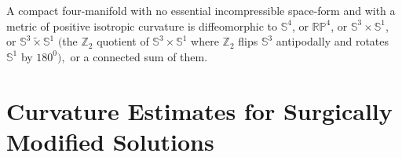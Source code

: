 \begin{theorem}
  \label{thm:cz-positive-isotropic-curvature-four-manifold-classification}

A compact four-manifold with no essential incompressible
space-form and with a metric of positive isotropic curvature is
diffeomorphic to $\mathbb{S}^4$, or $\mathbb{RP}^4$, or
$\mathbb{S}^3\times \mathbb{S}^1$, or
$\mathbb{S}^3\widetilde{\times}\mathbb{S}^1$ $($the $\mathbb{Z}_2$
quotient of $\mathbb{S}^{3}\times \mathbb{S}^{1}$ where
$\mathbb{Z}_{2}$ flips $\mathbb{S}^{3}$ antipodally and rotates
$\mathbb{S}^{1}$ by $180^{0}),$ or a connected sum of them.
\end{theorem}
\section{Curvature Estimates for Surgically Modified Solutions}
